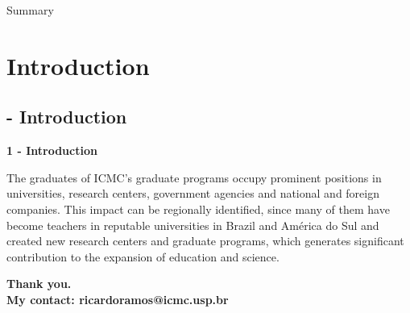\documentclass[handout,xcolor=table]{beamer}
\begin{document}
\begin{frame}[noframenumbering]
    \titlepage
  \vspace{-0.6 cm}
  \setlength{\tabcolsep}{1.0cm}
\end{frame}

\setcounter{tocdepth}{1}
\begin{frame}[noframenumbering]{Summary}
    \tableofcontents
\end{frame}

\section{Introduction}
\subsection{\thesection - Introduction}

\begin{frame}
    \textbf{1 - Introduction}

    The graduates of ICMC's graduate programs occupy prominent positions in universities, research centers, government agencies and national and foreign companies. This impact can be regionally identified, since many of them have become teachers in reputable universities in Brazil and América do Sul and created new research centers and graduate programs, which generates significant contribution to the expansion of education and science.
\end{frame}


\begin{frame}

\centering
\textbf{Thank you. \\ My contact: ricardoramos@icmc.usp.br} 
\end{frame}
\end{document}
